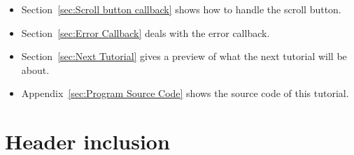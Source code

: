 \documentclass[11pt,oneside,a4paper,final]{article}
\begin{document}
\begin{itemize}
 \item Section~\ref{sec:Scroll button callback} shows how to handle the 
  scroll button.
 
 \item Section~\ref{sec:Error Callback} deals with the error callback. 
 
 \item Section~\ref{sec:Next Tutorial} gives a preview of what the next 
  tutorial will be about.
 
 \item Appendix~\ref{sec:Program Source Code} shows the source code of this 
	tutorial. 
	
\end{itemize}


\section{Header inclusion}
\label{sec:Header inclusion}
\end{document}
